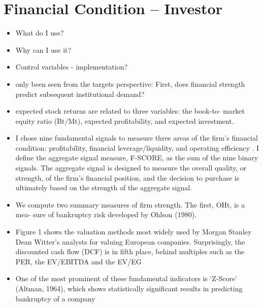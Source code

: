 \documentclass[12pt]{article}
\begin{document}
\section{Financial Condition -- Investor}

    \begin{itemize}
        \item What do I use? 
        \item Why can I use it?
        \item Control variables - implementation?

        \item only been seen from the targets perspective: First, does financial strength predict subsequent institutional demand? \citep{Choi2012}

        \item expected stock returns are related to three variables: the book-to-
        market equity ratio (Bt/Mt), expected profitability, and expected investment.\citep{Fama2006}
        
        \item I chose nine fundamental signals to measure three areas of the firm's financial condition: profitability, financial leverage/liquidity, and operating efficiency \citep{Piotroski2000}. I define the aggregate signal measure, F-SCORE, as the sum of the nine binary signals. The aggregate signal is designed to measure the overall quality, or strength, of the firm's financial position, and the decision to purchase is ultimately based on the strength of the aggregate signal.

        \item We compute two summary measures of firm strength. The first, OHt, is a mea- sure of bankruptcy risk developed by Ohlson (1980).\citep{Fama2006}

        \item Figure 1 shows the valuation methods most widely used by Morgan Stanley Dean Witter’s analysts for valuing European companies. Surprisingly, the discounted cash flow (DCF) is in fifth place, behind multiples such as the PER, the EV/EBITDA and the EV/EG \citep{Fernandez2001}

        \item One of the most prominent of these fundamental indicators is ‘Z-Score’ (Altman, 1964), which shows statistically significant results in predicting bankruptcy of a company \citep{Mohr2012}

    \end{itemize}
\end{document}
